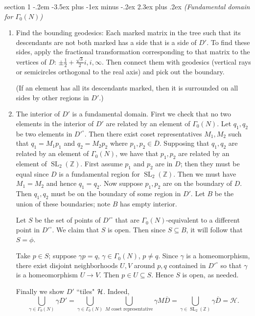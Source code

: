 \documentclass[12pt]{article}
\makeatletter
\theoremstyle{norm}
\newcommand{\Z}[0]{\mathbb{Z}}
\newcommand{\rc}[1]{\frac{1}{#1}}
\newcommand{\subeq}[0]{\subseteq}
\newcommand{\ga}[0]{\gamma}
\newcommand{\Ga}[0]{\Gamma}
\newcommand{\SL}{\operatorname{SL}}
\newenvironment{problem}{\@startsection
       {section}
       {1}
       {-.2em}
       {-3.5ex plus -1ex minus -.2ex}
       {2.3ex plus .2ex}
       {\pagebreak[3]%
       \large\bf\noindent{Problem }
       }
       }
       {%
       }
\makeatother
\begin{document}
\begin{problem} {\it(Fundamental domain for $\Ga_0(N)$)}
\begin{enumerate}

\item Find the bounding geodesics: Each marked matrix in the tree such that its descendants are not both marked has a side that is a side of $D'$. To find these sides, apply the fractional transformation corresponding to that matrix to the vertices of $D$: $\pm\rc{2}+\frac{\sqrt3}{2}i,i,\infty$. Then connect them with geodesics (vertical rays or semicircles orthogonal to the real axis) and pick out the boundary.

(If an element has all its descendants marked, then it is surrounded on all sides by other regions in $D'$.)

\item The interior of $D'$ is a fundamental domain. First we check that no two elements in the interior of $D'$ are related by an element of $\Ga_0(N)$. Let $q_1,q_2$ be two elements in $D'^{\circ}$. %
Then there exist coset representatives $M_1,M_2$ such that $q_1=M_1p_1$ and $q_2=M_2p_2$ where $p_1,p_2\in \overline{D}$. Supposing that $q_1,q_2$ are related by an element of $\Ga_0(N)$, we have that $p_1,p_2$ are related by an element of $\SL_2(\Z)$. 
First assume $p_1$ and $p_2$ are in $D$; then they must be equal since $D$ is a fundamental region for $\SL_2(\Z)$. Then we must have $M_1=M_2$ and hence $q_1=q_2$. Now suppose $p_1,p_2$ are on the boundary of $D$. Then $q_1,q_2$ must be on the boundary of some region in $D'$. Let $B$ be the union of these boundaries; note $B$ has empty interior.

Let $S$ be the set of points of $D'^{\circ}$ that are $\Ga_0(N)$-equivalent to a different point in $D'^{\circ}$. We claim that $S$ is open. Then since $S\subeq B$, it will follow that $S=\phi$. 

Take $p\in S$; suppose $\ga p=q$, $\ga\in \Ga_0(N)$, $p\neq q$. Since $\ga$ is a homeomorphism, there exist disjoint neighborhoods $U,V$ around $p,q$ contained in $D'^{\circ}$ so that $\ga$ is a homeomorphism $U\to V$. Then $p\in U\subeq S$. Hence $S$ is open, as needed.


Finally we show $D'$ ``tiles" $\cal H$. Indeed,
\[
\bigcup_{\ga\in \Ga_0(N)}\ga D'=\bigcup_{\ga\in \Ga_0(N)} \bigcup_{M\text{ coset representative}}\ga M\overline{D}
=\bigcup_{\ga\in \SL_2(\Z)} \ga \overline{D}=\mathcal H.
\]
\end{enumerate}
\end{problem}
\end{document}
